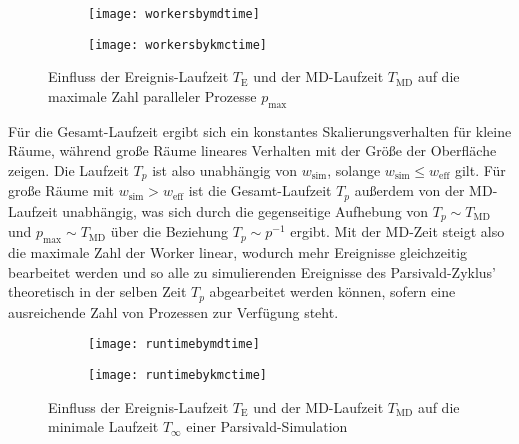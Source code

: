 \begin{figure}[p]

  \captionsetup[subfigure]{singlelinecheck=false}
  \def\subfigwidth{7cm}
  \begin{subfigure}[t]{\subfigwidth}
    \texttt{[image: workersbymdtime]}
  \end{subfigure}
  \hfill
  \begin{subfigure}[t]{\subfigwidth}
    \texttt{[image: workersbykmctime]}
  \end{subfigure}

  \caption[$p_\text{max}$ in Abhängigkeit von $T_\text{E}$ und $T_\text{MD}$]{Einfluss der Ereignis-Laufzeit $T_\text{E}$ und der MD-Laufzeit $T_\text{MD}$ auf die maximale Zahl paralleler Prozesse $p_\text{max}$}
  \label{fig:workersbytime}

\end{figure}

Für die Gesamt-Laufzeit ergibt sich ein konstantes Skalierungsverhalten für kleine Räume, während große Räume lineares Verhalten mit der Größe der Oberfläche zeigen.
Die Laufzeit $T_p$ ist also unabhängig von $w_\text{sim}$, solange $w_\text{sim} \le w_\text{eff}$ gilt.
Für große Räume mit $w_\text{sim} > w_\text{eff}$ ist die Gesamt-Laufzeit $T_p$ außerdem von der MD-Laufzeit unabhängig, was sich durch die gegenseitige Aufhebung von $T_p \sim T_\text{MD}$ und $p_\text{max} \sim T_\text{MD}$ über die Beziehung $T_p \sim p^{-1}$ ergibt.
Mit der MD-Zeit steigt also die maximale Zahl der Worker linear, wodurch mehr Ereignisse gleichzeitig bearbeitet werden und so alle zu simulierenden Ereignisse des Parsivald-Zyklus' theoretisch in der selben Zeit $T_p$ abgearbeitet werden können, sofern eine ausreichende Zahl von Prozessen zur Verfügung steht.

\begin{figure}[p]

  \captionsetup[subfigure]{singlelinecheck=false}
  \def\subfigwidth{7cm}
  \begin{subfigure}[t]{\subfigwidth}
    \texttt{[image: runtimebymdtime]}
  \end{subfigure}
  \hfill
  \begin{subfigure}[t]{\subfigwidth}
    \texttt{[image: runtimebykmctime]}
  \end{subfigure}

  \caption[$T_\infty$ in Abhängigkeit von $T_\text{E}$ und $T_\text{MD}$]{Einfluss der Ereignis-Laufzeit $T_\text{E}$ und der MD-Laufzeit $T_\text{MD}$ auf die minimale Laufzeit $T_\infty$ einer Parsivald-Simulation}
  \label{fig:runtimebytime}

\end{figure}

